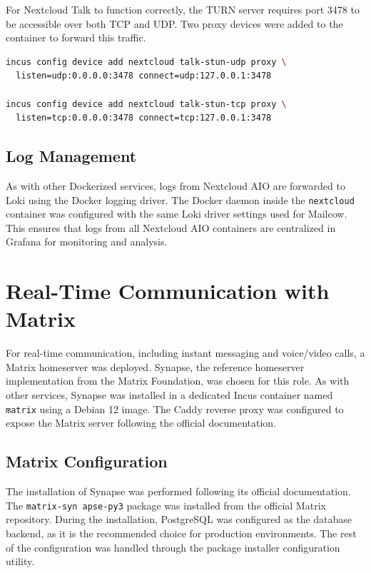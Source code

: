 For Nextcloud Talk to function correctly, the TURN server requires port 3478 to be accessible over both TCP and UDP. Two proxy devices were added to the container to forward this traffic.

\begin{lstlisting}[language=bash,caption={Commands to forward the ports required for Nextcloud Talk}]
incus config device add nextcloud talk-stun-udp proxy \
  listen=udp:0.0.0.0:3478 connect=udp:127.0.0.1:3478

incus config device add nextcloud talk-stun-tcp proxy \
  listen=tcp:0.0.0.0:3478 connect=tcp:127.0.0.1:3478
\end{lstlisting}

\subsection*{Log Management}

As with other Dockerized services, logs from Nextcloud AIO are forwarded to Loki using the Docker logging driver. The Docker daemon inside the \texttt{nextcloud} container was configured with the same Loki driver settings used for Mailcow. This ensures that logs from all Nextcloud AIO containers are centralized in Grafana for monitoring and analysis.

\section{Real-Time Communication with Matrix}

For real-time communication, including instant messaging and voice/video calls, a Matrix homeserver was deployed. Synapse, the reference homeserver implementation from the Matrix Foundation, was chosen for this role. As with other services, Synapse was installed in a dedicated Incus container named \texttt{matrix} using a Debian 12 image. The Caddy reverse proxy was configured to expose the Matrix server following the official documentation\cite{matrix-caddy-reverse-proxy}.

\subsection*{Matrix Configuration}

The installation of Synapse was performed following its official documentation\cite{synapse-install-debian}. The \texttt{matrix-syn apse-py3} package was installed from the official Matrix repository. During the installation, PostgreSQL was configured as the database backend, as it is the recommended choice for production environments. The rest of the configuration was handled through the package installer configuration utility.

